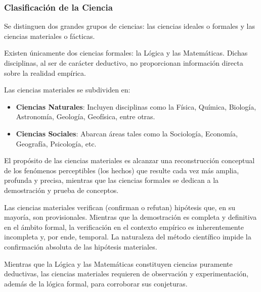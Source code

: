 \subsubsection{Clasificación de la Ciencia}

Se distinguen dos grandes grupos de ciencias: las ciencias ideales o formales y las ciencias materiales o fácticas.

Existen únicamente dos ciencias formales: la Lógica y las Matemáticas. Dichas disciplinas, al ser de carácter deductivo, no proporcionan información directa sobre la realidad empírica.

Las ciencias materiales se subdividen en:
\begin{itemize}
    \item \textbf{Ciencias Naturales}: Incluyen disciplinas como la Física, Química, Biología, Astronomía, Geología, Geofísica, entre otras.
    \item \textbf{Ciencias Sociales}: Abarcan áreas tales como la Sociología, Economía, Geografía, Psicología, etc.
\end{itemize}

El propósito de las ciencias materiales es alcanzar una reconstrucción conceptual de los fenómenos perceptibles (los hechos) que resulte cada vez más amplia, profunda y precisa, mientras que las ciencias formales se dedican a la demostración y prueba de conceptos.

Las ciencias materiales verifican (confirman o refutan) hipótesis que, en su mayoría, son provisionales. Mientras que la demostración es completa y definitiva en el ámbito formal, la verificación en el contexto empírico es inherentemente incompleta y, por ende, temporal. La naturaleza del método científico impide la confirmación absoluta de las hipótesis materiales.

Mientras que la Lógica y las Matemáticas constituyen ciencias puramente deductivas, las ciencias materiales requieren de observación y experimentación, además de la lógica formal, para corroborar sus conjeturas.

